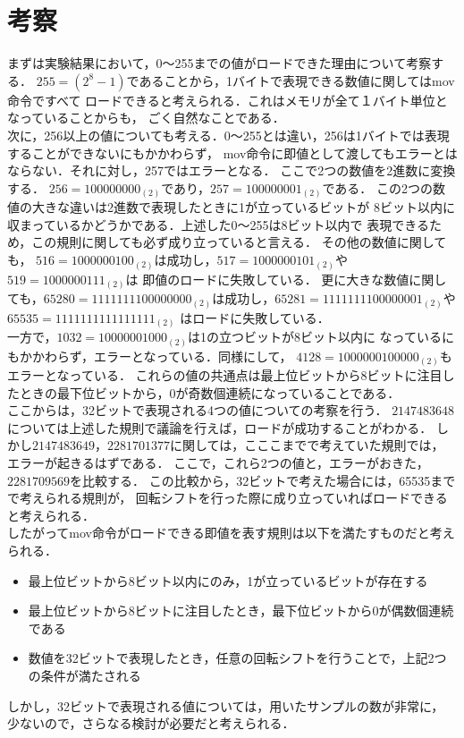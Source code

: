 \documentclass[a4j]{jarticle}
\begin{document}
\section{考察}
まずは実験結果において，0〜255までの値がロードできた理由について考察する．
$255=(2^{8}-1)$であることから，1バイトで表現できる数値に関してはmov命令ですべて
ロードできると考えられる．これはメモリが全て１バイト単位となっていることからも，
ごく自然なことである．\\
\indent 次に，256以上の値についても考える．0〜255とは違い，256は1バイトでは表現することができないにもかかわらず，
mov命令に即値として渡してもエラーとはならない．それに対し，257ではエラーとなる．
ここで2つの数値を2進数に変換する．
$256=100000000_{(2)}$であり，$257=100000001_{(2)}$である．
この2つの数値の大きな違いは2進数で表現したときに1が立っているビットが
8ビット以内に収まっているかどうかである．上述した0〜255は8ビット以内で
表現できるため，この規則に関しても必ず成り立っていると言える．
その他の数値に関しても，
$516=1000000100_{(2)}$は成功し，$517=1000000101_{(2)}$や$519=1000000111_{(2)}$は
即値のロードに失敗している．
更に大きな数値に関しても，$65280=1111111100000000_{(2)}$は成功し，$65281=1111111100000001_{(2)}$や$65535=1111111111111111_{(2)}$
はロードに失敗している．\\
\indent 一方で，$1032=10000001000_{(2)}$は1の立つビットが8ビット以内に
なっているにもかかわらず，エラーとなっている．同様にして，
$4128=1000000100000_{(2)}$もエラーとなっている．
これらの値の共通点は最上位ビットから8ビットに注目したときの最下位ビットから，0が奇数個連続になっていることである．\\
\indent ここからは，32ビットで表現される4つの値についての考察を行う．
$2147483648$については上述した規則で議論を行えば，ロードが成功することがわかる．
しかし$2147483649$，$2281701377$に関しては，こここまでで考えていた規則では，
エラーが起きるはずである．
ここで，これら2つの値と，エラーがおきた，$2281709569$を比較する．
この比較から，32ビットで考えた場合には，65535までで考えられる規則が，
回転シフトを行った際に成り立っていればロードできると考えられる．\\
\indent したがってmov命令がロードできる即値を表す規則は以下を満たすものだと考えられる．
\begin{itemize}
   \item 最上位ビットから8ビット以内にのみ，1が立っているビットが存在する
   \item 最上位ビットから8ビットに注目したとき，最下位ビットから0が偶数個連続である
   \item 数値を32ビットで表現したとき，任意の回転シフトを行うことで，上記2つの条件が満たされる
\end{itemize}
しかし，32ビットで表現される値については，用いたサンプルの数が非常に，
少ないので，さらなる検討が必要だと考えられる．
\end{document}
